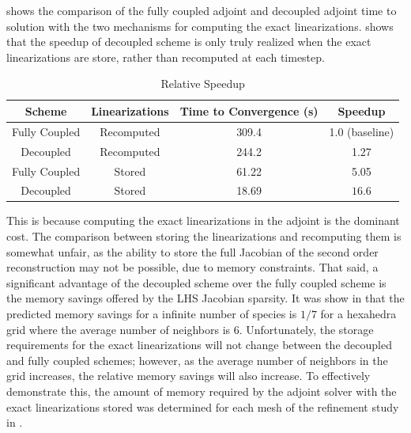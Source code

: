  shows the comparison of the fully coupled adjoint and 
decoupled adjoint time to solution with the two mechanisms for computing the
exact linearizations.   shows that the speedup of
decoupled scheme is only truly realized when the exact linearizations are store,
rather than recomputed at each timestep. 
\begin{table}[h]
  \centering
  \begin{tabular}{c|c|c|c}
    Scheme & Linearizations & Time to Convergence (s) & Speedup \\
    \hline
    Fully Coupled & Recomputed  & 309.4 & 1.0 (baseline)\\
    Decoupled     & Recomputed  & 244.2 & 1.27 \\
    Fully Coupled & Stored      & 61.22 & 5.05 \\
    Decoupled     & Stored      & 18.69 & $\mathbf{16.6}$ \\
  \end{tabular}
  \caption{Relative Speedup}
  \label{tab:srp-rel-speedup}
\end{table}
This is because computing the exact linearizations in the adjoint is the
dominant cost.  The comparison between storing the linearizations and
recomputing them is somewhat unfair, as the ability to store the full Jacobian
of the second order reconstruction may not be possible, due to memory
constraints.  That said, a significant advantage of the decoupled scheme over
the fully coupled scheme is the memory savings offered by the LHS Jacobian
sparsity. It was show in  that the
predicted memory savings for a infinite number of species is $1/7$ for a
hexahedra grid where the average number of neighbors is 6.  Unfortunately, the
storage requirements for the exact linearizations will not change between the
decoupled and fully coupled schemes; however, as the average number of neighbors
in the grid increases, the relative memory savings will also increase.  To
effectively demonstrate this, the amount of memory required by the adjoint
solver with the exact linearizations stored was determined for each mesh of the
refinement study in .
